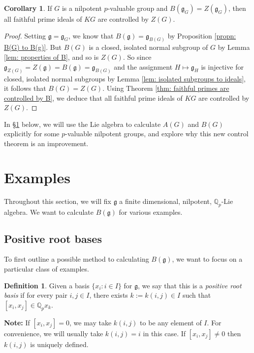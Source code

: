 \documentclass[12pt,a4paper]{article}
\let\\=\cr
\theoremstyle{definition}
\newtheorem{cor}[thm]{Corollary}
\newtheorem{defn}[thm]{Definition}
\theoremstyle{remark}
\theoremstyle{custthm}
\begin{document}
\begin{cor}\label{cor: when B(G)=Z(G)}
If $G$ is a nilpotent $p$-valuable group and $B(\mathfrak{g}_G)=Z(\mathfrak{g}_G)$, then all faithful prime ideals of $KG$ are controlled by $Z(G)$.    
\end{cor}

\begin{proof}
Setting $\mathfrak{g}=\mathfrak{g}_G$, we know that $B(\mathfrak{g})=\mathfrak{g}_{B(G)}$ by Proposition \ref{propn: B(G) to B(g)}. But $B(G)$ is a closed, isolated normal subgroup of $G$ by Lemma \ref{lem: properties of B}, and so is $Z(G)$. So since $\mathfrak{g}_{Z(G)}=Z(\mathfrak{g})=B(\mathfrak{g})=\mathfrak{g}_{B(G)}$ and the assignment $H\mapsto\mathfrak{g}_H$ is injective for closed, isolated normal subgroups by Lemma \ref{lem: isolated subgroups to ideals}, it follows that $B(G)=Z(G)$. Using Theorem \ref{thm: faithful primes are controlled by B}, we deduce that all faithful prime ideals of $KG$ are controlled by $Z(G)$.\end{proof}

In \S \ref{sec: examples} below, we will use the Lie algebra to calculate $A(G)$ and $B(G)$ explicitly for some $p$-valuable nilpotent groups, and explore why this new control theorem is an improvement.

\section{Examples}\label{sec: examples}

Throughout this section, we will fix $\mathfrak{g}$ a finite dimensional, nilpotent, $\mathbb{Q}_p$-Lie algebra. We want to calculate $B(\mathfrak{g})$ for various examples.

\subsection{Positive root bases}

To first outline a possible method to calculating $B(\mathfrak{g})$, we want to focus on a particular class of examples.

\begin{defn}\label{defn: positive root basis}
Given a basis $\{x_i:i\in I\}$ for $\mathfrak{g}$, we say that this is a \emph{positive root basis} if for every pair $i,j\in I$, there exists $k:=k(i,j)\in I$ such that $[x_i,x_j]\in\mathbb{Q}_px_k$. 
\end{defn}

\textbf{Note:} If $[x_i,x_j]=0$, we may take $k(i,j)$ to be any element of $I$. For convenience, we will usually take $k(i,j)=i$ in this case. If $[x_i,x_j]\neq 0$ then $k(i,j)$ is uniquely defined.\\
\end{document}
